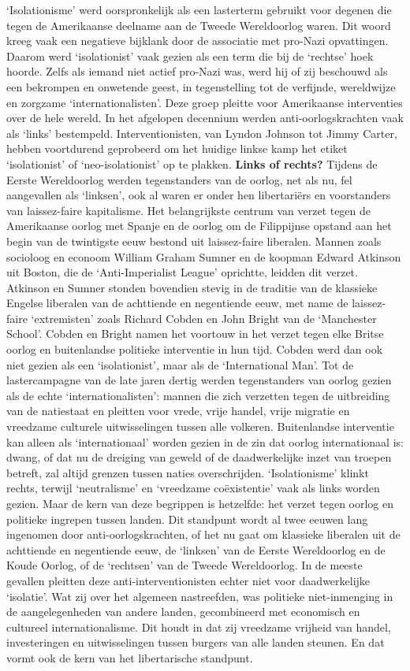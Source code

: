 \documentclass[
  a5paper,
  smalldemyvopaper,10pt,twoside,onecolumn,openright,extrafontsizes,hidelinks]{memoir}
\begin{document}
`Isolationisme' werd oorspronkelijk als een lasterterm gebruikt voor
degenen die tegen de Amerikaanse deelname aan de Tweede Wereldoorlog
waren. Dit woord kreeg vaak een negatieve bijklank door de associatie
met pro-Nazi opvattingen. Daarom werd `isolationist' vaak gezien als een
term die bij de `rechtse' hoek hoorde. Zelfs als iemand niet actief
pro-Nazi was, werd hij of zij beschouwd als een bekrompen en onwetende
geest, in tegenstelling tot de verfijnde, wereldwijze en zorgzame
`internationalisten'. Deze groep pleitte voor Amerikaanse interventies
over de hele wereld. In het afgelopen decennium werden
anti-oorlogskrachten vaak als `links' bestempeld. Interventionisten, van
Lyndon Johnson tot Jimmy Carter, hebben voortdurend geprobeerd om het
huidige linkse kamp het etiket `isolationist' of `neo-isolationist' op
te plakken. \textbf{Links of rechts?} Tijdens de Eerste Wereldoorlog
werden tegenstanders van de oorlog, net als nu, fel aangevallen als
`linksen', ook al waren er onder hen libertariërs en voorstanders van
laissez-faire kapitalisme. Het belangrijkste centrum van verzet tegen de
Amerikaanse oorlog met Spanje en de oorlog om de Filippijnse opstand aan
het begin van de twintigste eeuw bestond uit laissez-faire liberalen.
Mannen zoals socioloog en econoom William Graham Sumner en de koopman
Edward Atkinson uit Boston, die de `Anti-Imperialist League' oprichtte,
leidden dit verzet. Atkinson en Sumner stonden bovendien stevig in de
traditie van de klassieke Engelse liberalen van de achttiende en
negentiende eeuw, met name de laissez-faire `extremisten' zoals Richard
Cobden en John Bright van de `Manchester School'. Cobden en Bright namen
het voortouw in het verzet tegen elke Britse oorlog en buitenlandse
politieke interventie in hun tijd. Cobden werd dan ook niet gezien als
een `isolationist', maar als de `International Man'. Tot de
lastercampagne van de late jaren dertig werden tegenstanders van oorlog
gezien als de echte `internationalisten': mannen die zich verzetten
tegen de uitbreiding van de natiestaat en pleitten voor vrede, vrije
handel, vrije migratie en vreedzame culturele uitwisselingen tussen alle
volkeren. Buitenlandse interventie kan alleen als `internationaal'
worden gezien in de zin dat oorlog internationaal is: dwang, of dat nu
de dreiging van geweld of de daadwerkelijke inzet van troepen betreft,
zal altijd grenzen tussen naties overschrijden. `Isolationisme' klinkt
rechts, terwijl `neutralisme' en `vreedzame coëxistentie' vaak als links
worden gezien. Maar de kern van deze begrippen is hetzelfde: het verzet
tegen oorlog en politieke ingrepen tussen landen. Dit standpunt wordt al
twee eeuwen lang ingenomen door anti-oorlogskrachten, of het nu gaat om
klassieke liberalen uit de achttiende en negentiende eeuw, de `linksen'
van de Eerste Wereldoorlog en de Koude Oorlog, of de `rechtsen' van de
Tweede Wereldoorlog. In de meeste gevallen pleitten deze
anti-interventionisten echter niet voor daadwerkelijke `isolatie'. Wat
zij over het algemeen nastreefden, was politieke niet-inmenging in de
aangelegenheden van andere landen, gecombineerd met economisch en
cultureel internationalisme. Dit houdt in dat zij vreedzame vrijheid van
handel, investeringen en uitwisselingen tussen burgers van alle landen
steunen. En dat vormt ook de kern van het libertarische standpunt.
\end{document}
